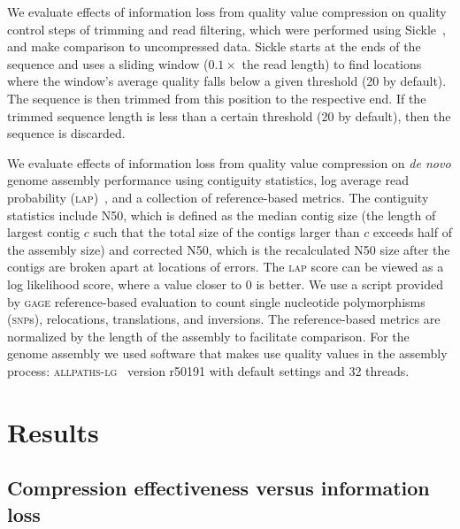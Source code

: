 \documentclass{bioinfo}
\begin{document}
\begin{methods}
We evaluate effects of information loss from quality value compression
on quality control steps of trimming and read filtering, which were
performed using Sickle~\citep{sickle}, and make comparison to
uncompressed data. Sickle starts at the ends of the sequence and uses
a sliding window ($0.1 \times$ the read length) to find locations
where the window's average quality falls below a given threshold (20
by default). The sequence is then trimmed from this position to the
respective end.
If the trimmed sequence length is less than a certain threshold (20 by
default), then the sequence is discarded.

We evaluate effects of information loss from quality value compression
on \emph{de novo} genome assembly performance using contiguity
statistics, log average read probability
(\textsc{lap})~\citep{Ghodsi:2013hb}, and a collection of
reference-based metrics. The contiguity statistics include N50, which
is defined as the median contig size (the length of largest contig $c$
such that the total size of the contigs larger than $c$ exceeds half
of the assembly size) and corrected N50, which is the recalculated N50
size after the contigs are broken apart at locations of errors. The
\textsc{lap} score can be viewed as a log likelihood score, where a
value closer to 0 is better. We use a script provided by \textsc{gage}
reference-based evaluation to count single nucleotide polymorphisms
(\textsc{snp}s), relocations, translations, and inversions. The
reference-based metrics are normalized by the length of the assembly
to facilitate comparison. For the genome assembly we used software
that makes use quality values in the assembly process:
\textsc{allpaths-lg}~\citep{Gnerre:2011kx} version r50191 with default
settings and 32 threads.

\end{methods}

\section{Results}

\subsection{Compression effectiveness versus information loss}
\end{document}
